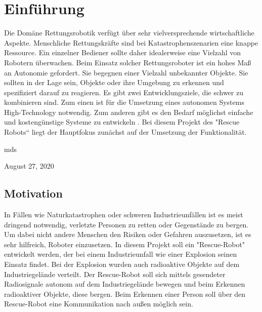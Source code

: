 
\section{Einführung}
Die Domäne Rettungsrobotik verfügt über sehr vielversprechende wirtschaftliche Aspekte. Menschliche Rettungskräfte sind bei Katastrophenszenarien eine knappe Ressource. Ein einzelner Bediener sollte daher idealerweise eine Vielzahl von Robotern überwachen. Beim Einsatz solcher Rettungsroboter ist ein hohes Maß an Autonomie gefordert. Sie begegnen einer Vielzahl unbekannter Objekte. Sie sollten in der Lage sein, Objekte oder ihre Umgebung zu erkennen und spezifiziert darauf zu reagieren. Es gibt zwei Entwicklungsziele, die schwer zu kombinieren sind. Zum einen ist für die Umsetzung eines autonomen Systems High-Technology notwendig. Zum anderen gibt es den Bedarf möglichst einfache und kostengünstige Systeme zu entwickeln \cite{birk2006rescue}. Bei diesem Projekt des "Rescue Robots“ liegt der Hauptfokus zunächst auf der Umsetzung der Funktionalität.

\hfill mds

\hfill August 27, 2020

\subsection{Motivation}
In Fällen wie Naturkatastrophen oder schweren Industrieunfällen ist es meist dringend notwendig, verletzte Personen zu retten oder Gegenstände zu bergen. Um dabei nicht andere Menschen den Risiken oder Gefahren auszusetzen, ist es sehr hilfreich, Roboter einzusetzen. In diesem Projekt soll ein "Rescue-Robot" entwickelt werden, der bei einem Industrieunfall wie einer Explosion seinen Einsatz findet. Bei der Explosion wurden auch radioaktive Objekte auf dem Industriegelände verteilt. Der Rescue-Robot soll sich mittels gesendeter Radiosignale autonom auf dem Industriegelände bewegen und beim Erkennen radioaktiver Objekte, diese bergen. Beim Erkennen einer Person soll über den Rescue-Robot eine Kommunikation nach außen möglich sein.
